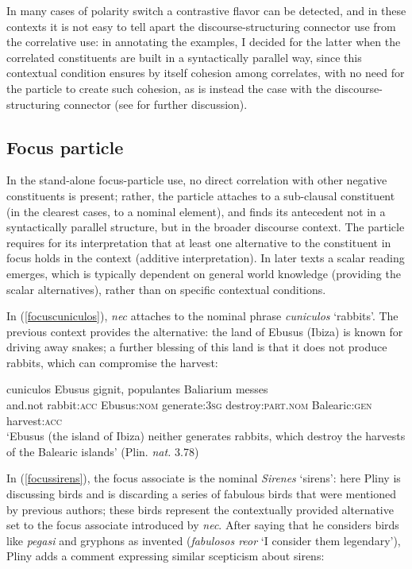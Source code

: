 \documentclass[output=paper,modfonts,nonflat,citecolor=brown,
showindex
]{langsci/langscibook}
\begin{document}
In many cases of polarity switch a contrastive flavor can be detected, and in these contexts it is not easy to tell apart the discourse-structuring connector use from the correlative use: in annotating the examples, I decided for the latter when the correlated constituents are built in a syntactically parallel way, since this contextual condition ensures by itself cohesion among correlates, with no need for the particle to create such cohesion, as is instead the case with the discourse-structuring connector (see \citealt[]{OrlandiniPoccetti07} for further discussion). 

\subsection{Focus particle} \label{functionfocusparticle}

In the stand-alone focus-particle use, no direct correlation with other negative constituents is present; rather, the particle attaches to a sub-clausal constituent (in the clearest cases, to a nominal element), and finds its antecedent not in a syntactically parallel structure, but in the broader discourse context. The particle requires for its interpretation that at least one alternative to the constituent in focus holds in the context (additive interpretation). In later texts a scalar reading emerges, which is typically dependent on general world knowledge (providing the scalar alternatives), rather than on specific contextual conditions. 

In (\ref{focuscuniculos}), {\emph{nec}} attaches to the nominal phrase {\emph{cuniculos}} `rabbits'. The previous context provides the alternative: the land of Ebusus (Ibiza) is known for driving away snakes; a further blessing of this land is that it does not produce rabbits, which can compromise the harvest: 

{\begin{exe}
\ex \label{focuscuniculos}  cuniculos Ebusus gignit, populantes Baliarium messes\\
and.not rabbit:{\textsc{acc}} Ebusus:{\textsc{nom}} generate:{\textsc{3sg}} destroy:{\textsc{part.nom}} Balearic:{\textsc{gen}} harvest:{\textsc{acc}}\\

`Ebusus (the island of Ibiza) neither generates rabbits, which destroy the harvests of the Balearic islands' (Plin. {\emph{nat.}} 3.78)
\end{exe}}

\noindent In (\ref{focussirens}), the focus associate is the nominal {\emph{Sirenes}} `sirens': here Pliny is discussing birds and is discarding a series of fabulous birds that were mentioned by previous authors; these birds represent the contextually provided alternative set to the focus associate introduced by {\emph{nec}}. After saying that he considers birds like {\emph{pegasi}} and gryphons as invented ({\emph{fabulosos reor}} `I consider them legendary'), Pliny adds a comment expressing similar scepticism about sirens:
\end{document}
